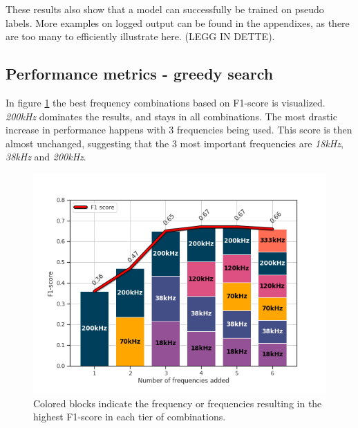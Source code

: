    
    These results also show that a model can successfully be trained on pseudo labels. More examples on logged output can be found in the appendixes, as there are too many to efficiently illustrate here. (LEGG IN DETTE). 
    
    \subsection{Performance metrics - greedy search}
        In figure \ref{increasing_freq_f1_score_fig} the best frequency combinations based on F1-score is visualized. \textit{200kHz} dominates the results, and stays in all combinations. The most drastic increase in performance happens with 3 frequencies being used. This score is then almost unchanged, suggesting that the 3 most important frequencies are \textit{18kHz}, \textit{38kHz} and \textit{200kHz}.
        \begin{figure}[H]
            \centering
            \includegraphics[scale=0.7]{figures/increasing_freq_f1.png}
            \caption[Best frequency combination - F1-score]{Colored blocks indicate the frequency or frequencies resulting in the highest F1-score in each tier of combinations.}
          	\medskip 
            \label{increasing_freq_f1_score_fig}
        \end{figure}

